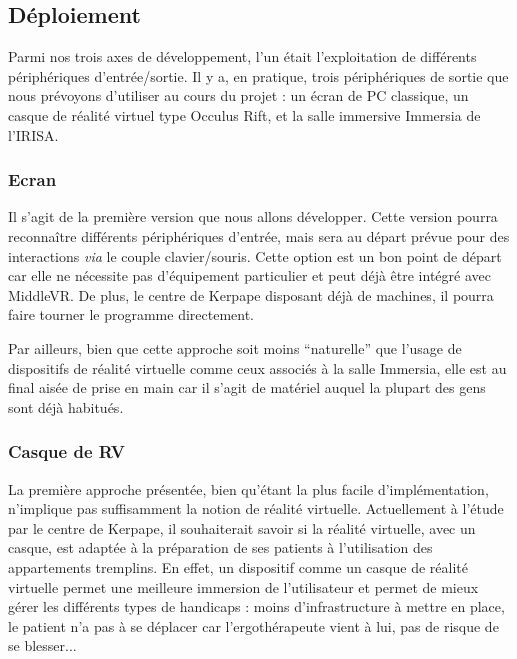 \subsection{Déploiement}
Parmi nos trois axes de développement, l'un était l'exploitation de différents périphériques d'entrée/sortie. Il y a, en pratique, trois périphériques de sortie que nous prévoyons d'utiliser au cours du projet : un écran de PC classique, un casque de réalité virtuel type Occulus Rift, et la salle immersive Immersia de l'IRISA.

\subsubsection{Ecran}
Il s'agit de la première version que nous allons développer. Cette version pourra reconnaître différents périphériques d'entrée, mais sera au départ prévue pour des interactions \textit{via} le couple clavier/souris. Cette option est un bon point de départ car elle ne nécessite pas d'équipement particulier et peut déjà être intégré avec MiddleVR. De plus, le centre de Kerpape disposant déjà de machines, il pourra faire tourner le programme directement. \newline

Par ailleurs, bien que cette approche soit moins \enquote{naturelle} que l'usage de dispositifs de réalité virtuelle comme ceux associés à la salle Immersia, elle est au final aisée de prise en main car il s'agit de matériel auquel la plupart des gens sont déjà habitués.

\subsubsection{Casque de RV}
La première approche présentée, bien qu'étant la plus facile d’implémentation, n'implique pas suffisamment la notion de réalité virtuelle. Actuellement à l'étude par le centre de Kerpape, il souhaiterait savoir si la réalité virtuelle, avec un casque, est adaptée à la préparation de ses patients à l’utilisation des appartements tremplins. 
En effet, un dispositif comme un casque de réalité virtuelle permet une meilleure immersion de l'utilisateur et permet de mieux gérer les différents types de handicaps : moins d'infrastructure à mettre en place, le patient n'a pas à se déplacer car l'ergothérapeute vient à lui, pas de risque de se blesser...


